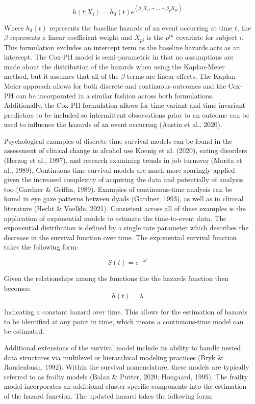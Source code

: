 \documentclass[12pt]{./styles/outhesis}
\begin{document}
\[
h(t|X_{i}) = h_0(t)e^{( \beta_1 X_{1i}+...+\beta_pX_{pi})}
\]

Where \(h_0(t)\) represents the baseline hazards of an event occurring
at time \(t\), the \(\beta\) represents a linear coefficient weight and
\(X_{pi}\) is the \(p^{th}\) covariate for subject \(i\). This
formulation excludes an intercept term as the baseline hazards acts as
an intercept. The Cox-PH model is semi-parametric in that no assumptions
are made about the distribution of the hazards when using the
Kaplan-Meier method, but it assumes that all of the \(\beta\) terms are
linear effects. The Kaplan-Meier approach allows for both discrete and
continuous outcomes and the Cox-PH can be incorporated in a similar
fashion across both formulations. Additionally, the Cox-PH formulation
allows for time variant and time invariant predictors to be included so
intermittent observations prior to an outcome can be used to influence
the hazards of an event occurring (Austin et al., 2020).

Psychological examples of discrete time survival models can be found in
the assessment of clinical change in alcohol use Koenig et al. (2020),
eating disorders (Herzog et al., 1997), and research examining trends in
job turnover (Morita et al., 1989). Continuous-time survival models are
much more sparingly applied given the increased complexity of acquiring
the data and potentially of analysis too (Gardner \& Griffin, 1989).
Examples of continuous-time analysis can be found in eye gaze patterns
between dyads (Gardner, 1993), as well as in clinical literature
(Hecht \& Voelkle, 2021). Consistent across all of these examples is
the application of exponential models to estimate the time-to-event
data. The exponential distribution is defined by a single rate parameter
which describes the decrease in the survival function over time. The
exponential survival function takes the following form:

\[
S(t) = e^{-\lambda t}
\]

Given the relationships among the functions the the hazards function
then becomes: \[h(t) = \lambda \]

Indicating a constant hazard over time. This allows for the estimation
of hazards to be identified at any point in time, which means a
continuous-time model can be estimated.

Additional extensions of the survival model include its ability to
handle nested data structures via multilevel or hierarchical modeling
practices (Bryk \& Raudenbush, 1992). Within the survival nomenclature,
these models are typically referred to as frailty models (Balan \&
Putter, 2020; Hougaard, 1995). The frailty model incorporates an
additional cluster specific components into the estimation of the hazard
function. The updated hazard takes the following form:
\end{document}
